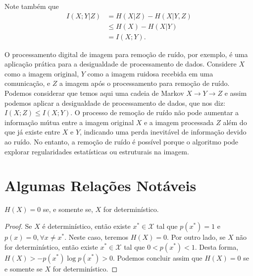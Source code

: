 Note também que
\begin{subequations}
  \begin{align}
    I(X; Y|Z) &= H(X|Z) - H(X|Y,Z) \\
              &\leq H(X) - H(X|Y) \\
              &= I(X;Y) .
  \end{align}
\end{subequations}

O processamento digital de imagem para remoção de ruído, por exemplo, é uma
aplicação prática para a desigualdade de processamento de dados. Considere $X$
como a imagem original, $Y$ como a imagem ruidosa recebida em uma comunicação,
e $Z$  a imagem após o processamento para remoção de ruído. Podemos considerar
que temos aqui uma cadeia de Markov $X \rightarrow Y \rightarrow Z$ e assim
podemos aplicar a desigualdade de processamento de dados, que nos diz:
$I(X;Z) \leq I(X;Y)$. O processo de remoção de ruído não pode aumentar a informação
mútua entre a imagem original $X$ e a imagem processada $Z$ além do que já
existe entre $X$ e $Y$, indicando uma perda inevitável de informação devido ao
ruído. No entanto, a remoção de ruído é possível porque o algoritmo pode
explorar regularidades estatísticas ou estruturais na imagem.









\section{Algumas Relações Notáveis}

\begin{proposition}\label{prop:detincertnull}
$H(X)=0$ se, e somente se, $X$ for determinístico.
\end{proposition}
\begin{proof}
Se $X$ é determinístico, então existe $x^\ast \in \mathcal{X}$ tal que $p(x^\ast) = 1$ e
$p(x) = 0, \forall x \neq x^\ast$. Neste caso, teremos $H(X) = 0$.
Por outro lado, se $X$ não for determinístico, então existe $x^\ast \in \mathcal{X}$ tal que $0 < p(x^\ast) < 1$.
Desta forma, $H(X) > -p(x^\ast) \log p(x^\ast) > 0$. Podemos concluir assim que
$H(X) = 0$ se e somente se $X$ for determinístico.
\end{proof}


